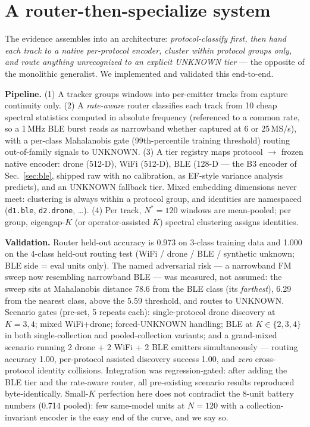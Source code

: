 \documentclass[conference]{IEEEtran}
\begin{document}
\section{A router-then-specialize system}
\label{sec:system}

The evidence assembles into an architecture: \emph{protocol-classify first, then hand each track
to a native per-protocol encoder, cluster within protocol groups only, and route anything
unrecognized to an explicit UNKNOWN tier} --- the opposite of the monolithic generalist. We
implemented and validated this end-to-end.

\textbf{Pipeline.} (1) A tracker groups windows into per-emitter tracks from capture continuity
only. (2) A \emph{rate-aware} router classifies each track from 10 cheap spectral statistics
computed in absolute frequency (referenced to a common rate, so a 1\,MHz BLE burst reads as
narrowband whether captured at 6 or 25\,MS/s), with a per-class Mahalanobis gate (99th-percentile
training threshold) routing out-of-family signals to UNKNOWN. (3) A tier registry maps protocol
$\to$ frozen native encoder: drone (512-D), WiFi (512-D), BLE (128-D --- the B3 encoder of
Sec.~\ref{sec:ble}, shipped raw with no calibration, as EF-style variance analysis predicts), and
an UNKNOWN fallback tier. Mixed embedding dimensions never meet: clustering is always within a
protocol group, and identities are namespaced (\texttt{d1.ble}, \texttt{d2.drone}, \dots).
(4) Per track, $N^{*}{=}120$ windows are mean-pooled; per group, eigengap-$K$ (or operator-assisted
$K$) spectral clustering assigns identities.

\textbf{Validation.} Router held-out accuracy is 0.973 on 3-class training data and 1.000 on the
4-class held-out routing test (WiFi / drone / BLE / synthetic unknown; BLE side = eval units
only). The named adversarial risk --- a narrowband FM sweep now resembling narrowband BLE ---
was measured, not assumed: the sweep sits at Mahalanobis distance 78.6 from the BLE class (its
\emph{farthest}), 6.29 from the nearest class, above the 5.59 threshold, and routes to UNKNOWN.
Scenario gates (pre-set, 5 repeats each): single-protocol drone discovery at $K{=}3,4$;
mixed WiFi+drone; forced-UNKNOWN handling; BLE at $K\in\{2,3,4\}$ in both single-collection and
pooled-collection variants; and a grand-mixed scenario running 2 drone + 2 WiFi + 2 BLE emitters
simultaneously --- routing accuracy 1.00, per-protocol assisted discovery success 1.00, and
\emph{zero} cross-protocol identity collisions. Integration was regression-gated: after adding
the BLE tier and the rate-aware router, all pre-existing scenario results reproduced
byte-identically. Small-$K$ perfection here does not contradict the 8-unit battery numbers
(0.714 pooled): few same-model units at $N{=}120$ with a collection-invariant encoder is the
easy end of the curve, and we say so.
\end{document}
